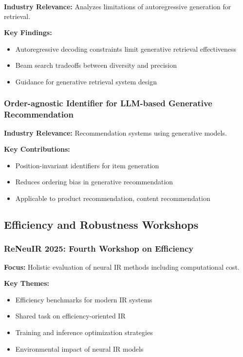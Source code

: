 \documentclass[11pt,letterpaper]{article}
\begin{document}
\textbf{Industry Relevance:} Analyzes limitations of autoregressive generation for retrieval.

\textbf{Key Findings:}
\begin{itemize}[leftmargin=*]
    \item Autoregressive decoding constraints limit generative retrieval effectiveness
    \item Beam search tradeoffs between diversity and precision
    \item Guidance for generative retrieval system design
\end{itemize}

\subsubsection{Order-agnostic Identifier for LLM-based Generative Recommendation}

\textbf{Industry Relevance:} Recommendation systems using generative models.

\textbf{Key Contributions:}
\begin{itemize}[leftmargin=*]
    \item Position-invariant identifiers for item generation
    \item Reduces ordering bias in generative recommendation
    \item Applicable to product recommendation, content recommendation
\end{itemize}

\subsection{Efficiency and Robustness Workshops}

\subsubsection{ReNeuIR 2025: Fourth Workshop on Efficiency}

\textbf{Focus:} Holistic evaluation of neural IR methods including computational cost.

\textbf{Key Themes:}
\begin{itemize}[leftmargin=*]
    \item Efficiency benchmarks for modern IR systems
    \item Shared task on efficiency-oriented IR
    \item Training and inference optimization strategies
    \item Environmental impact of neural IR models
\end{itemize}
\end{document}
